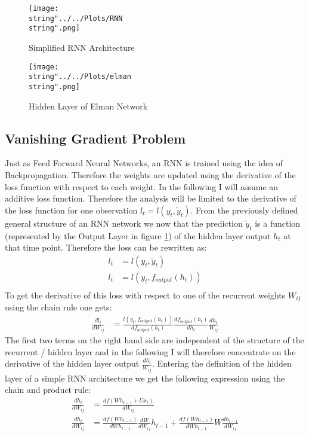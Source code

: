 \begin{figure}
  \centering
\texttt{[image: \\string"../../Plots/RNN\\string".png]}
  \caption{Simplified RNN Architecture}\label{fig:RNN}
\end{figure}

\begin{figure}
  \centering
\texttt{[image: \\string"../../Plots/elman\\string".png]}
  \caption{Hidden Layer of Elman Network}\label{fig:elman}
\end{figure}

\subsection{Vanishing Gradient Problem}
Just as Feed Forward Neural Networks, an RNN is trained using the idea of Backpropagation. Therefore the weights are updated using the derivative of the loss function with respect to each weight. In the following I will assume an additive loss function. Therefore the analysis will be limited to the derivative of the loss function for one observation $l_t = l(y_t, \tilde{y}_t)$. From the previously defined general structure of an RNN network we now that the prediction $\tilde{y}_t$ is a function (represented by the Output Layer in  figure \ref{fig:RNN}) of the hidden layer output $h_t$ at that time point. Therefore the loss can be rewritten as:
\begin{align*}
l_t &= l(y_t, \tilde{y}_t) \\
l_t &= l(y_t, f_{output}(h_t))\\
\end{align*}
To get the derivative of this loss with respect to one of the recurrent weights $W_{ij}$ using the chain rule one gets:
\begin{align*}
\frac{dl_t}{dW_{ij}} &= \frac{l(y_t, f_{output}(h_t))}{df_{output}(h_t)}\frac{df_{output}(h_t)}{dh_t}\frac{dh_t}{W_{ij}}
\end{align*}
The first two terms on the right hand side are independent of the structure of the recurrent / hidden layer and in the following I will therefore concentrate on the derivative of the hidden layer output $\frac{dh_t}{W_{ij}}$.
Entering the definition of the hidden layer of a simple RNN architecture we get the following expression using the chain and product rule:
\begin{align*}
\frac{dh_t}{dW_{ij}} &= \frac{df(Wh_{t-1} + Ux_t)}{dW_{ij}} \\
\frac{dh_t}{dW_{ij}} &= \frac{df(Wh_{t-1})}{dWh_{t-1}}\frac{dW}{dW_{ij}}h_{t-1} +\frac{df(Wh_{t-1})}{dWh_{t-1}} W\frac{dh_{t-1}}{dW_{ij}}
\end{align*}

